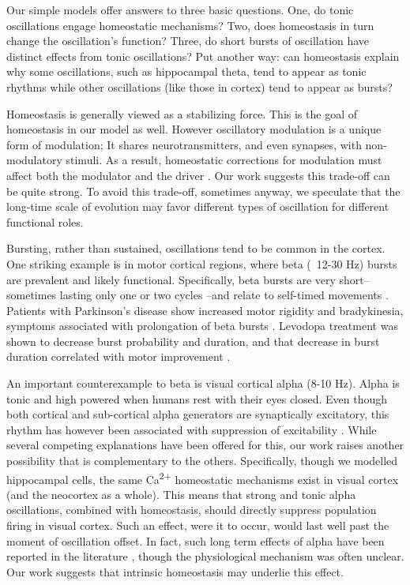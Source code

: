 \documentclass{article}
\begin{document}
Our simple models offer answers to three basic questions. One, do tonic oscillations engage homeostatic mechanisms? Two, does homeostasis in turn change the oscillation's function? Three, do short bursts of oscillation have distinct effects from tonic oscillations? Put another way: can homeostasis explain why some oscillations, such as hippocampal theta, tend to appear as tonic rhythms while other oscillations (like those in cortex) tend to appear as bursts? 

Homeostasis is generally viewed as a stabilizing force. This is the goal of homeostasis in our model as well. However oscillatory modulation is a unique form of modulation; It shares neurotransmitters, and even synapses, with non-modulatory stimuli. As a result, homeostatic corrections for modulation must affect both the modulator and the driver \cite{Sherman1998}. Our work suggests this trade-off can be quite strong. To avoid this trade-off, sometimes anyway, we speculate that the long-time scale of evolution may favor different types of oscillation for different functional roles. 

Bursting, rather than sustained, oscillations tend to be common in the cortex. One striking example is in motor cortical regions, where beta (~12-30 Hz) bursts are prevalent and likely functional. Specifically, beta bursts are very short--sometimes lasting only one or two cycles \cite{Sherman2016}--and relate to self-timed movements \cite{Feingold2015}. Patients with Parkinson's disease show increased motor rigidity and bradykinesia, symptoms associated with prolongation of beta bursts \cite{Tinkhauser2017}. Levodopa treatment was shown to decrease burst probability and duration, and that decrease in burst duration correlated with motor improvement \cite{Tinkhauser2017}.

An important counterexample to beta is visual cortical alpha (8-10 Hz). Alpha is tonic and high powered when humans rest with their eyes closed. Even though both cortical and sub-cortical alpha generators are synaptically excitatory, this rhythm has however been associated with suppression of excitability \cite{Jensen2002,Bonnefond2012,Peterson2017}. While several competing explanations have been offered \cite{Bonnefond2012,Lange2013,Peterson2017} for this, our work raises another possibility that is complementary to the others. Specifically, though we modelled hippocampal cells, the same Ca\textsuperscript{2+} homeostatic mechanisms exist in visual cortex (and the neocortex as a whole). This means that strong and tonic alpha oscillations, combined with homeostasis, should directly suppress population firing in visual cortex. Such an effect, were it to occur, would last well past the moment of oscillation offset. In fact, such long term effects of alpha have been reported in the literature \cite{Jensen2002,Bonnefond2012}, though the physiological mechanism was often unclear. Our work suggests that intrinsic homeostasis may underlie this effect.
\end{document}
